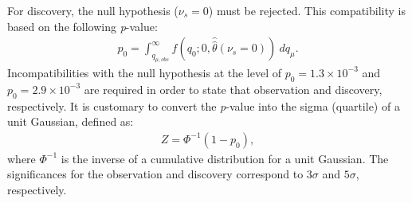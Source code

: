 For discovery, the null hypothesis ($\nu_s = 0$) must be rejected. This compatibility is based on the following \emph{p}-value:
\begin{equation}
    \label{eq:pvalue_bonly}
    \begin{aligned}
        p_{0} = \int_{q_{\mu,obs}}^\infty f(q_0;0,\hat{\hat{\theta}}(\nu_s =0))~dq_\mu.
    \end{aligned}
\end{equation}
Incompatibilities with the null hypothesis at the level of $p_0 = 1.3 \times 10^{-3}$ and $p_0 = 2.9 \times 10^{-3}$ are required in order to state that observation and discovery, respectively. It is customary to convert the \emph{p}-value into the sigma (quartile) of a unit Gaussian, defined as:
\begin{equation}
    \label{eq:sigma}
    \begin{aligned}
    Z = \Phi^{-1}(1-p_0),
    \end{aligned}
\end{equation}
where $\Phi^{-1}$ is the inverse of a cumulative distribution for a unit Gaussian. The significances for the observation and discovery correspond to $3\sigma$ and $5\sigma$, respectively.

